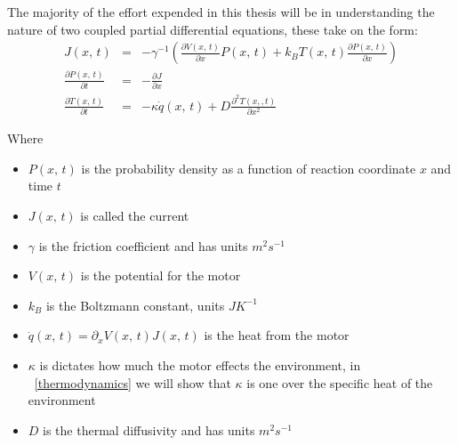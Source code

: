 
The majority of the effort expended in this thesis will be in understanding the nature of two coupled partial differential equations, these take on the form:
\begin{eqnarray}
J(x, \, t) &=& -\gamma^{-1} \left ( \frac{\partial V(x, \, t)}{\partial x} P(x, \, t) + k_B T(x, \, t) \frac{\partial P(x, \, t)}{\partial x} \right ) \label{eqn:current} \\
\frac{\partial P(x, \, t)}{\partial t} &=& -\frac{\partial J}{\partial x} \label{eqn:Smoluchowski} \\
\frac{\partial T(x, \, t)}{\partial t} &=& -\kappa \dot{q}(x, \, t) + D \frac{\partial^2 T(x, 
, t)}{\partial x^2} \label{eqn:TemperatureEvolution}
\end{eqnarray}

Where
\begin{itemize}
\item{$P(x, \, t)$ is the probability density as a function of  reaction coordinate $x$ and time $t$}
\item{$J(x, \, t)$ is called the current}
\item{$\gamma$ is the friction coefficient and has units $m^2 s^{-1}$}
\item{$V(x, \, t)$ is the potential for the motor}
\item{$k_B$ is the Boltzmann constant, units $J K^{-1}$}
\item{$\dot{q}(x, \, t) = \partial_x V(x, \, t) J(x, \, t)$ is the heat from the motor \cite{M.W.Jack2016}}
\item{$\kappa$ is dictates how much the motor effects the environment, in ~\autoref{thermodynamics} we will show that $\kappa$ is one over the specific heat of the environment}
\item{$D$ is the thermal diffusivity and has units $m^2 s^{-1}$}
\end{itemize}

